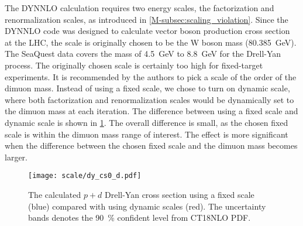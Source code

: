 \documentclass[../main.tex]{subfiles}
\begin{document}
The DYNNLO calculation requires two energy scales, the factorization and renormalization scales,
as introduced in \cref{M-subsec:scaling_violation}. Since the DYNNLO code was designed to calculate
vector boson production cross section at the LHC, the scale is originally chosen to be the W boson mass (\SI{80.385}{\GeV}).
The SeaQuest data covers the mass of \SI{4.5}{\GeV} to \SI{8.8}{\GeV} for the Drell-Yan
process. The originally chosen scale is certainly too high for fixed-target experiments.
It is recommended by the authors to pick a scale of the order of the dimuon mass.
Instead of using a fixed scale, we chose to turn on dynamic scale,
where both factorization and renormalization scales would be dynamically set to the dimuon mass at
each iteration.  The difference between using a fixed scale and dynamic scale is shown in \cref{fig:DY_scale}.
The overall difference is small, as the chosen fixed scale is within the dimuon mass range of interest.
The effect is more significant when the difference between the chosen fixed scale and the dimuon mass
becomes larger.
\begin{figure}[h!]
	\centering
	\texttt{[image: scale/dy\_cs0\_d.pdf]}
	\caption{The calculated $p+d$ Drell-Yan cross section using a fixed scale (blue) compared with using dynamic scales (red).
		The uncertainty bands denotes the \SI{90}{\percent} confident level from CT18NLO PDF.
	}
	\label{fig:DY_scale}
\end{figure}




\ifSubfilesClassLoaded{ \printbibliography[heading=bibintoc,title={References}]}{}
\end{document}
